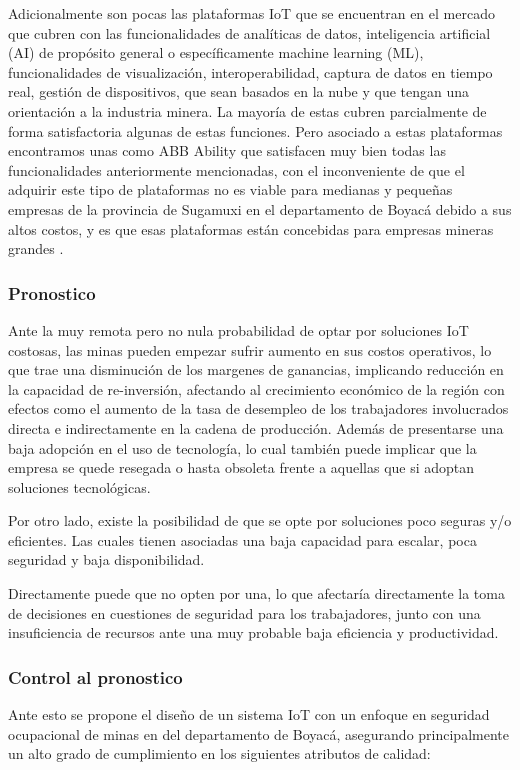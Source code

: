 \documentclass[stu,12pt,floatsintext]{apa7}
\begin{document}
	 Adicionalmente son pocas las plataformas IoT que se encuentran en el mercado que cubren con las funcionalidades de analíticas de datos,  inteligencia artificial (AI) de propósito general o específicamente machine learning (ML), funcionalidades de visualización, interoperabilidad, captura de datos en tiempo real, gestión de dispositivos, que sean basados en la nube y que tengan una orientación a la industria minera. La mayoría de estas cubren parcialmente de forma satisfactoria algunas de estas funciones. Pero asociado a estas plataformas encontramos unas como ABB Ability que satisfacen muy bien todas las funcionalidades anteriormente mencionadas, con el inconveniente de que el adquirir este tipo de plataformas no es viable para medianas y pequeñas empresas de la provincia de Sugamuxi en el departamento de Boyacá debido a sus altos costos, y es que esas plataformas están concebidas para empresas mineras grandes \cite{iot-platforms}.

	\subsubsection{Pronostico}
	Ante la muy remota pero no nula probabilidad de optar por soluciones IoT costosas, las minas pueden empezar sufrir aumento en sus costos operativos, lo que trae una disminución de los margenes de ganancias, implicando reducción en la capacidad de re-inversión, afectando al crecimiento económico de la región con efectos como el aumento de la tasa de desempleo de los trabajadores involucrados directa e indirectamente en la cadena de producción. Además de presentarse una baja adopción en el uso de tecnología, lo cual también puede implicar que la empresa se quede resegada o hasta obsoleta frente a aquellas que si adoptan soluciones tecnológicas.
	
	Por otro lado, existe la posibilidad de que se opte por soluciones poco seguras y/o eficientes. Las cuales tienen asociadas una baja capacidad para escalar, poca seguridad y baja disponibilidad.
	
	Directamente puede que no opten por una, lo que afectaría directamente la toma de decisiones en cuestiones de seguridad para los trabajadores, junto con una  insuficiencia de recursos ante una muy probable baja eficiencia y productividad.
	\subsubsection{Control al pronostico}
	Ante esto se propone el diseño de un sistema IoT con un enfoque en seguridad ocupacional de minas en del departamento de Boyacá, asegurando principalmente un alto grado de cumplimiento en los siguientes atributos de calidad:
	
\end{document}
